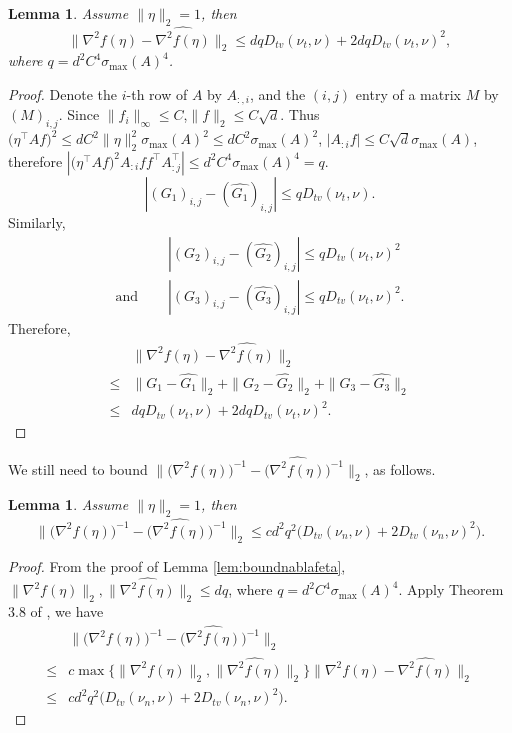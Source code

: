 \documentclass[english]{article} %
\providecommand{\lemmaname}{Lemma}
\providecommand{\lemmaname}{Lemma}
\theoremstyle{plain}
\theoremstyle{remark}
\theoremstyle{claim}
\theoremstyle{plain}
\newtheorem{lemma}[thm]{\protect\lemmaname}
\begin{document}
\begin{lemma}
\label{lem:nablavariation}
Assume $\|\eta\|_2 = 1$, then 
\[
\|\nabla^2 f(\eta) - \widehat{\nabla^2 f(\eta)}  \|_2 \le d q D_{tv}(\nu_t , \nu) + 2dq D_{tv}(\nu_t , \nu)^2,
\]
where $q = d^2C^4\sigma_{\max}(A)^4$.
\end{lemma}
\begin{proof}
Denote the $i$-th row of $A$ by $A_{:,i}$, and the $(i,j)$ entry of a matrix $M$ by $(M)_{i,j}$. Since $\|f_i\|_\infty \le C$,$\|f\|_2 \le C\sqrt{d}$. 
Thus $\big(\eta^{\top}Af\big)^2 \le d C^2\|\eta\|_2^2\sigma_{\max}(A)^2 \le d C^2\sigma_{\max}(A)^2 $,  $|A_{:i}f| \le C\sqrt{d}\sigma_{\max}(A)$, 
therefore $|\big(\eta^{\top}Af\big)^2 A_{:i}ff^{\top} A_{:j}^{\top}| \le d^2C^4\sigma_{\max}(A)^4 = q$.
\[
|(G_1)_{i,j} - (\widehat{G_1})_{i,j} | \le q D_{tv}(\nu_t , \nu).
\]
Similarly, 
\begin{align*}
& |(G_2)_{i,j} - (\widehat{G_2})_{i,j} | \le q D_{tv}(\nu_t , \nu)^2 \\
\text{and } \quad & |(G_3)_{i,j} - (\widehat{G_3})_{i,j} | \le q D_{tv}(\nu_t , \nu)^2.
\end{align*}
Therefore,
\begin{align*}
	& \|\nabla^2 f(\eta) - \widehat{\nabla^2 f(\eta)}  \|_2 \\
\le & \|G_1 - \widehat{G_1}\|_2 + \|G_2 - \widehat{G_2}\|_2 + \|G_3 - \widehat{G_3}\|_2 \\
\le & d q D_{tv}(\nu_t , \nu) + 2dq D_{tv}(\nu_t , \nu)^2.
\end{align*}
\end{proof}

We still need to bound $\|\big(\nabla^2 f(\eta)\big)^{-1} - \big(\widehat{\nabla^2 f(\eta)}\big)^{-1}  \|_2 $, as follows.
\begin{lemma}
Assume $\|\eta\|_2 = 1$, then 
\[
\|\big(\nabla^2 f(\eta)\big)^{-1} - \big(\widehat{\nabla^2 f(\eta)}\big)^{-1}  \|_2 \le cd^2q^2\big(D_{tv}(\nu_n , \nu) + 2D_{tv}(\nu_n , \nu)^2\big).
\]
\end{lemma}
\begin{proof}
From the proof of Lemma \ref{lem:boundnablafeta}, $\|\nabla^2 f(\eta)\|_2, \|\widehat{\nabla^2 f(\eta)}\|_2 \le dq$, where $q = d^2C^4\sigma_{\max}(A)^4$.
Apply Theorem 3.8 of \citep*{stewart1990matrix}, we have 
\begin{align*}
& \|\big(\nabla^2 f(\eta)\big)^{-1} - \big(\widehat{\nabla^2 f(\eta)}\big)^{-1}  \|_2 \\
\le & c\max\{\|\nabla^2 f(\eta)\|_2, \|\widehat{\nabla^2 f(\eta)}\|_2\} \|\nabla^2 f(\eta) - \widehat{\nabla^2 f(\eta)}\|_2 \\
\le & cd^2q^2\big(D_{tv}(\nu_n , \nu) + 2D_{tv}(\nu_n , \nu)^2\big).
\end{align*}

\end{proof}
\fi
\end{document}
